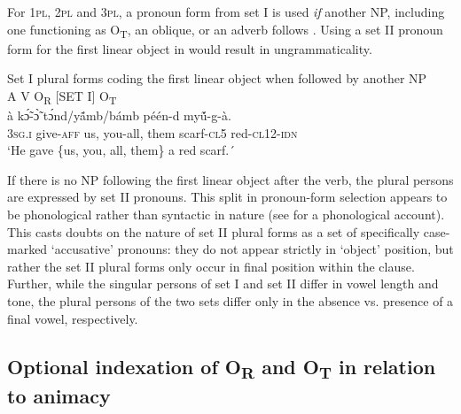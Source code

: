 \documentclass[output=paper]{langsci/langscibook}
\begin{document}
 

   
    

For 1\textsc{pl}, 2\textsc{pl} and 3\textsc{pl}, a pronoun form from set I is used \textit{if} another NP, including one functioning as O\textsubscript{T}, an oblique, or an adverb follows . Using a set II pronoun form for the first linear object in  would result in ungrammaticality.


\ea\label{ex:fig:2.pacchiarotti}
{  Set I plural forms coding the first linear object when followed by another NP}\\
\glll 
  A  V  {O\textsubscript{R} [SET I]}  O\textsubscript{T}\\
à   k\'{\~ɔ}-\`{\~ɔ}    t\'{ɔ}nd/y\'{\~a}mb/bámb    {péén-d}  {my\'{\~u}-g-à}.\\
 {3}\textsc{sg.i}  give-\textsc{aff}  {us, you-all, them}   scarf-\textsc{cl}5   red-\textsc{cl}12-\textsc{idn}\\
\glt `He gave \{us, you, all, them\} a red scarf.´
\z

If there is no NP following the first linear object after the verb, the plural persons are expressed by set II pronouns. This split in pronoun-form selection appears to be phonological rather than syntactic in nature (see \citealt{peterson1971} for a phonological account). This casts doubts on the nature of set II plural forms as a set of specifically case-marked `accusative' pronouns: they do not appear strictly in `object' position, but rather the set II plural forms only occur in final position within the clause. Further, while the singular persons of set I and set II differ in vowel length and tone, the plural persons of the two sets differ only in the absence vs. presence of a final vowel, respectively. 

\subsection{Optional indexation of O\textsubscript{R} and O\textsubscript{T} in relation to animacy}\label{§4.4:optional.pacchiarotti}
\end{document}
